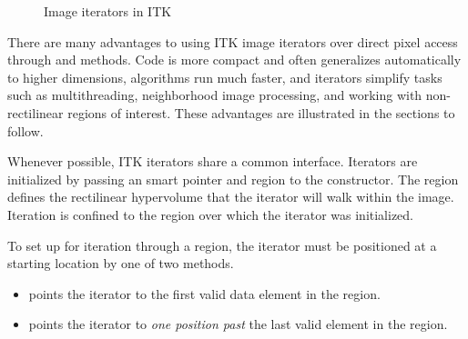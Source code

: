
\begin{figure}
\centering
\caption[Image iterators in ITK]{Image iterators in ITK}
\protect\label{fig:ImageIterators}
\end{figure}

There are many advantages to using ITK image iterators over direct pixel access
through  and  methods.  Code is
more compact and often generalizes automatically to higher dimensions,
algorithms run much faster, and iterators simplify tasks such as
multithreading, neighborhood image processing, and working with non-rectilinear
regions of interest.  These advantages are illustrated in the sections to
follow.


Whenever possible, ITK iterators share a common interface.  Iterators are
initialized by passing an  smart pointer and region to the
constructor.  The region defines the rectilinear hypervolume that the iterator
will walk within the image.  Iteration is confined to the region over which the
iterator was initialized.

To set up for iteration through a region, the iterator must be positioned at a
starting location by one of two methods.

\begin{itemize}
\item \textbf{} points the iterator to the first valid
data element in the region.

\item \textbf{} points the iterator to \emph{one position past}
the last valid element in the region.
\end{itemize}

